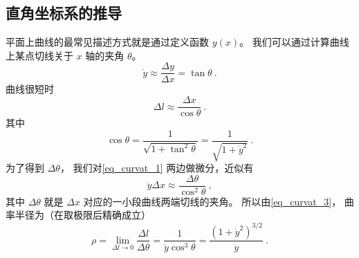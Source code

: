 \subsection{直角坐标系的推导}
平面上曲线的最常见描述方式就是通过定义函数 $y(x)$。 我们可以通过计算曲线上某点切线关于 $x$ 轴的夹角 $\theta$。
\begin{equation}\label{eq_curvat_1}
\dot y \approx \frac{\Delta y}{\Delta x} = \tan \theta~.
\end{equation}
曲线很短时
\begin{equation}
\Delta{l} \approx \frac{\Delta{x}}{\cos\theta}~.
\end{equation}
其中
\begin{equation}\label{eq_curvat_2}
\cos\theta = \frac{1}{\sqrt{1 + \tan^2\theta}} = \frac{1}{\sqrt{1 + \dot y^2}}~.
\end{equation}
为了得到 $\Delta{\theta}$， 我们对\autoref{eq_curvat_1} 两边做微分，近似有
\begin{equation}
\ddot y \Delta{x} \approx \frac{\Delta{\theta}}{\cos^2\theta}~,
\end{equation}
其中 $\Delta{\theta}$ 就是 $\Delta{x}$ 对应的一小段曲线两端切线的夹角。 所以由\autoref{eq_curvat_3}， 曲率半径为（在取极限后精确成立）
\begin{equation}
\rho = \lim_{\Delta l\to 0}\frac{\Delta l}{\Delta \theta} = \frac{1}{\ddot y\cos^3\theta} = \frac{(1 + \dot y^2)^{3/2}}{\ddot y}~.
\end{equation}

